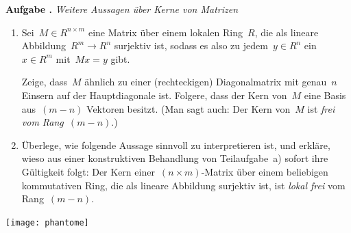 \documentclass[a4paper,ngerman,12pt]{scrartcl}
\theoremstyle{definition}
\theoremstyle{plain}
\theoremstyle{remark}
\renewcommand{\_}{\mathpunct{.}\,}
\newcommand{\?}{\,{:}\,}
\newlength{\aufgabenskip}
\newcounter{aufgabennummer}
\newenvironment{aufgabe}[1]{
  \addtocounter{aufgabennummer}{1}
  \textbf{Aufgabe \theaufgabennummer{}.} \emph{#1} \par
}{\vspace{\aufgabenskip}}
\begin{document}
\begin{aufgabe}{Weitere Aussagen über Kerne von Matrizen}
\begin{enumerate}
\item Sei~$M \in R^{n \times m}$ eine Matrix über einem lokalen Ring~$R$, die
als lineare Abbildung~$R^m \to R^n$ surjektiv ist, sodass es also zu jedem~$y
\in R^n$ ein~$x \in R^m$ mit~$Mx = y$ gibt.

Zeige, dass~$M$ ähnlich zu einer (rechteckigen) Diagonalmatrix mit genau~$n$
Einsern auf der Hauptdiagonale ist. Folgere, dass der Kern von~$M$ eine Basis
aus~$(m - n)$ Vektoren besitzt. (Man sagt auch: Der Kern von~$M$ ist \emph{frei
vom Rang~$(m-n)$}.)

\item Überlege, wie folgende Aussage sinnvoll zu interpretieren ist, und
erkläre, wieso aus einer konstruktiven Behandlung von Teilaufgabe~a) sofort
ihre Gültigkeit folgt:
Der Kern einer~$(n \times m)$-Matrix über einem beliebigen kommutativen
Ring, die als lineare Abbildung surjektiv ist, ist \emph{lokal frei} vom
Rang~$(m-n)$.
\end{enumerate}
\end{aufgabe}

\begin{center}
  \texttt{[image: phantome]}
\end{center}
\thispagestyle{empty}
\end{document}
